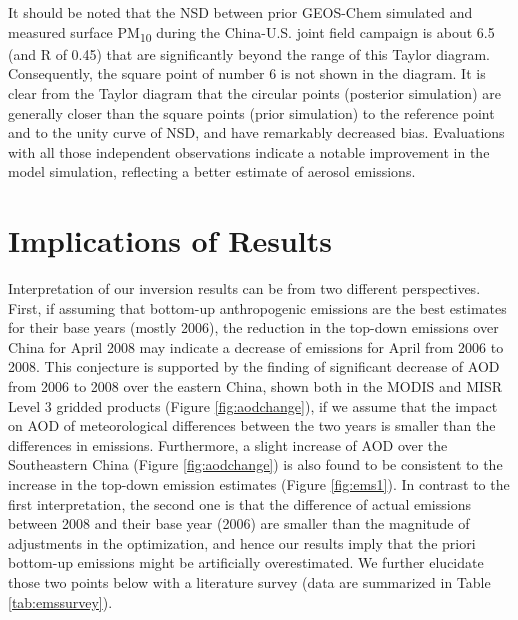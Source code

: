  It should be noted that the NSD between prior GEOS-Chem simulated
 and measured surface PM\textsubscript{10} during the China-U.S. joint field campaign
 is about 6.5 (and R of 0.45) that are significantly beyond the range of this Taylor diagram.
 Consequently, the square point of number 6 is not shown in the diagram.
 It is clear from the Taylor diagram that the circular points (posterior simulation)
 are generally closer than the square points (prior simulation) to the reference point
 and to the unity curve of NSD, and have remarkably decreased bias.
 Evaluations with all those independent observations indicate a notable
 improvement in the model simulation, reflecting a better estimate of aerosol emissions.

\section{Implications of Results} \label{sec:invimplication}

  Interpretation of our inversion results can be from two different perspectives. 
First, if assuming that bottom-up anthropogenic emissions are the best estimates for their base years (mostly 2006), 
the reduction in the top-down emissions over China for April 2008 may indicate a decrease of emissions for April from 2006 to 2008. 
This conjecture is supported by the finding of significant decrease of AOD from 2006 to 2008 over the eastern China, 
shown both in the MODIS and MISR Level 3 gridded products (Figure \ref{fig:aodchange}),
if we assume that the impact on AOD of meteorological differences between the two years is smaller than the differences in emissions.
Furthermore, a slight increase of AOD over the Southeastern China (Figure \ref{fig:aodchange}) 
is also found to be consistent to the increase in the top-down emission estimates (Figure \ref{fig:ems1}). 
In contrast to the first interpretation, the second one is that the difference of actual emissions between 2008 and their base year (2006)
are smaller than the magnitude of adjustments in the optimization, 
and hence our results imply that the priori bottom-up emissions might be artificially overestimated. 
We further elucidate those two points below with a literature survey (data are summarized in Table \ref{tab:emssurvey}).

